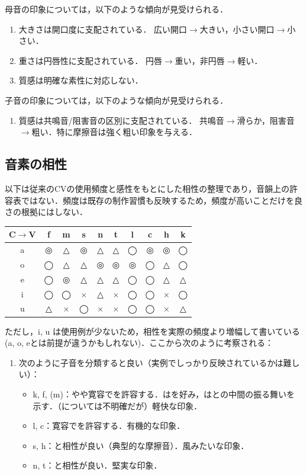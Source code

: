 \documentclass[../../main-detail.tex]{subfiles}
\begin{document}
母音の印象については，以下のような傾向が見受けられる．
\begin{enumerate}[label=(\arabic*)]
    \item 大きさは開口度に支配されている．
    広い開口$\to$大きい，小さい開口$\to$小さい．
    \item 重さは円唇性に支配されている．
    円唇$\to$重い，非円唇$\to$軽い．
    \item 質感は明確な素性に対応しない．%
\end{enumerate}

子音の印象については，以下のような傾向が見受けられる．
\begin{enumerate}[label=(\arabic*)]
    \item 質感は共鳴音/阻害音の区別に支配されている．
    共鳴音$\to$滑らか，阻害音$\to$粗い．特に摩擦音は強く粗い印象を与える．
\end{enumerate}

\subsection{音素の相性}\label{subsec:phoneme-affinity}

以下は従来のCVの使用頻度と感性をもとにした相性の整理であり，音韻上の許容表ではない．頻度は既存の制作習慣も反映するため，頻度が高いことだけを良さの根拠にはしない．
\begin{table}[H]
    \centering
    \begin{tabular}{cccccccccc}
        \toprule
        C$\to$V & f & m & s & n & t & l & c & h & k\\
        \midrule
        a & ◎ & △ & ◎ & △ & △ & ◯ & ◎ & ◎ & ◯\\
        o & ◯ & △ & △ & ◎ & ◎ & ◎ & ◯ & △ & ◯\\
        e & ◯ & ◎ & △ & △ & △ & ◯ & ◯ & △ & △\\
        \midrule
        i & ◯ & ◯ & × & △ & × & ◯ & ◯ & × & ◯\\
        u & △ & × & ◯ & × & × & ◯ & ◯ & × & △\\
        \bottomrule
    \end{tabular}
\end{table}
ただし，i, u は使用例が少ないため，相性を実際の頻度より増幅して書いている(a, o, eとは前提が違うかもしれない)．ここから次のように考察される：
\begin{enumerate}
    \item 次のように子音を分類すると良い（実例でしっかり反映されているかは難しい）：
    \begin{itemize}
        \item k, f, (m)：やや寛容でを許容する．はを好み，はとの中間の振る舞いを示す．（については不明確だが）軽快な印象．
        \item l, c：寛容でを許容する．有機的な印象．
        \item s, h：と相性が良い（典型的な摩擦音）．風みたいな印象．
        \item n, t：と相性が良い．堅実な印象．
    \end{itemize}
\end{enumerate}
\end{document}
